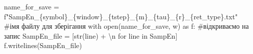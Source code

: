 \documentclass[
  letterpaper,
]{report}
\newenvironment{Shaded}{\begin{snugshade}}{\end{snugshade}}
\newcommand{\BuiltInTok}[1]{\textcolor[rgb]{0.00,0.23,0.31}{#1}}
\newcommand{\CharTok}[1]{\textcolor[rgb]{0.13,0.47,0.30}{#1}}
\newcommand{\CommentTok}[1]{\textcolor[rgb]{0.37,0.37,0.37}{#1}}
\newcommand{\ControlFlowTok}[1]{\textcolor[rgb]{0.00,0.23,0.31}{#1}}
\newcommand{\ImportTok}[1]{\textcolor[rgb]{0.00,0.46,0.62}{#1}}
\newcommand{\KeywordTok}[1]{\textcolor[rgb]{0.00,0.23,0.31}{#1}}
\newcommand{\NormalTok}[1]{\textcolor[rgb]{0.00,0.23,0.31}{#1}}
\newcommand{\OperatorTok}[1]{\textcolor[rgb]{0.37,0.37,0.37}{#1}}
\newcommand{\SpecialCharTok}[1]{\textcolor[rgb]{0.37,0.37,0.37}{#1}}
\newcommand{\SpecialStringTok}[1]{\textcolor[rgb]{0.13,0.47,0.30}{#1}}
\newcommand{\StringTok}[1]{\textcolor[rgb]{0.13,0.47,0.30}{#1}}
\begin{document}
\begin{Shaded}
\begin{Highlighting}[]
\NormalTok{name\_for\_save }\OperatorTok{=} \SpecialStringTok{f"SampEn\_}\SpecialCharTok{\{}\NormalTok{symbol}\SpecialCharTok{\}}\SpecialStringTok{\_}\SpecialCharTok{\{}\NormalTok{window}\SpecialCharTok{\}}\SpecialStringTok{\_}\SpecialCharTok{\{}\NormalTok{tstep}\SpecialCharTok{\}}\SpecialStringTok{\_}\SpecialCharTok{\{}\NormalTok{m}\SpecialCharTok{\}}\SpecialStringTok{\_}\SpecialCharTok{\{}\NormalTok{tau}\SpecialCharTok{\}}\SpecialStringTok{\_}\SpecialCharTok{\{}\NormalTok{r}\SpecialCharTok{\}}\SpecialStringTok{\_}\SpecialCharTok{\{}\NormalTok{ret\_type}\SpecialCharTok{\}}\SpecialStringTok{.txt"} \CommentTok{\#ім\textquotesingle{}я файлу для зберігання}
\ControlFlowTok{with} \BuiltInTok{open}\NormalTok{(name\_for\_save, }\StringTok{\textquotesingle{}w\textquotesingle{}}\NormalTok{) }\ImportTok{as}\NormalTok{ f: }\CommentTok{\#відкриваємо на запис }
\NormalTok{    SampEn\_file }\OperatorTok{=}\NormalTok{ [}\BuiltInTok{str}\NormalTok{(line) }\OperatorTok{+} \StringTok{\textquotesingle{}}\CharTok{\textbackslash{}n}\StringTok{\textquotesingle{}} \ControlFlowTok{for}\NormalTok{ line }\KeywordTok{in}\NormalTok{ SampEn]}
\NormalTok{    f.writelines(SampEn\_file)}
\end{Highlighting}
\end{Shaded}
\end{document}

